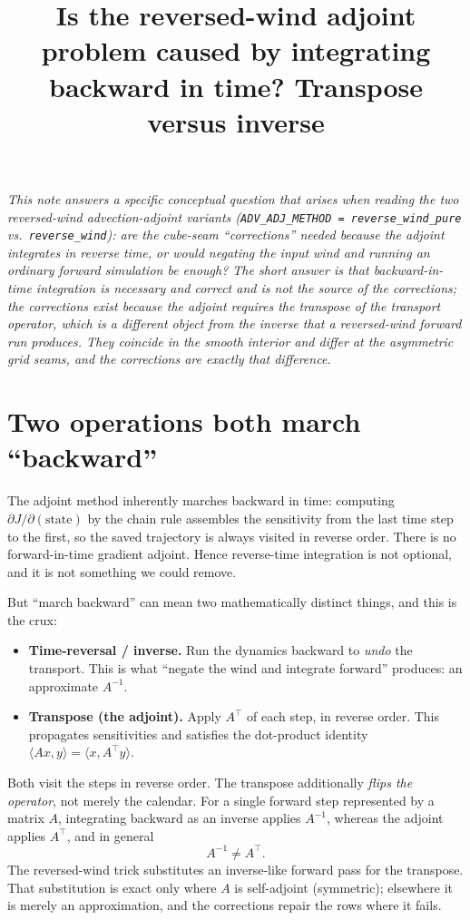 \documentclass[11pt]{article}
\title{Is the reversed-wind adjoint problem caused by integrating\\
       backward in time? Transpose versus inverse}
\author{}
\date{}
\newcommand{\code}[1]{\texttt{#1}}
\begin{document}
\maketitle

\noindent\emph{This note answers a specific conceptual question that arises when
reading the two reversed-wind advection-adjoint variants
(\code{ADV\_ADJ\_METHOD = reverse\_wind\_pure} vs.\ \code{reverse\_wind}): are the
cube-seam ``corrections'' needed because the adjoint integrates in reverse time,
or would negating the input wind and running an ordinary forward simulation be
enough? The short answer is that backward-in-time integration is necessary and
correct and is \emph{not} the source of the corrections; the corrections exist
because the adjoint requires the \emph{transpose} of the transport operator,
which is a different object from the \emph{inverse} that a reversed-wind forward
run produces. They coincide in the smooth interior and differ at the asymmetric
grid seams, and the corrections are exactly that difference.}

\section{Two operations both march ``backward''}

The adjoint method inherently marches backward in time: computing
$\partial J/\partial(\text{state})$ by the chain rule assembles the sensitivity
from the last time step to the first, so the saved trajectory is always visited
in reverse order. There is no forward-in-time gradient adjoint. Hence reverse-time
integration is not optional, and it is not something we could remove.

But ``march backward'' can mean two mathematically distinct things, and this is
the crux:
\begin{itemize}
  \item \textbf{Time-reversal / inverse.} Run the dynamics backward to
  \emph{undo} the transport. This is what ``negate the wind and integrate
  forward'' produces: an approximate $A^{-1}$.
  \item \textbf{Transpose (the adjoint).} Apply $A^\top$ of each step, in reverse
  order. This propagates sensitivities and satisfies the dot-product identity
  $\langle A x, y\rangle = \langle x, A^\top y\rangle$.
\end{itemize}
Both visit the steps in reverse order. The transpose additionally \emph{flips the
operator}, not merely the calendar. For a single forward step represented by a
matrix $A$, integrating backward as an inverse applies $A^{-1}$, whereas the
adjoint applies $A^\top$, and in general
\begin{equation}
  A^{-1} \neq A^\top .
\end{equation}
The reversed-wind trick substitutes an inverse-like forward pass for the
transpose. That substitution is exact only where $A$ is self-adjoint
(symmetric); elsewhere it is merely an approximation, and the corrections repair
the rows where it fails.
\end{document}
